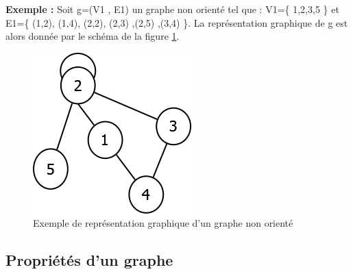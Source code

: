 \textbf{Exemple :}
 Soit g=(V1 , E1) un graphe non orienté tel que : V1=\{ 1,2,3,5 \} et E1=\{ (1,2), (1,4), (2,2), (2,3) ,(2,5) ,(3,4) \}.
La représentation graphique de g est alors donnée par le schéma de la figure \ref{graphNonOriente}.
\\
\begin{figure}[H]
\begin{center}
\includegraphics[height=120 pt, width=130 pt]{./ressources/image/graphNonOriente.png} 
\end{center}
\caption{Exemple de représentation graphique d'un graphe non orienté}
\label{graphNonOriente}
\end{figure}

		\subsection{Propriétés d'un graphe}
		
